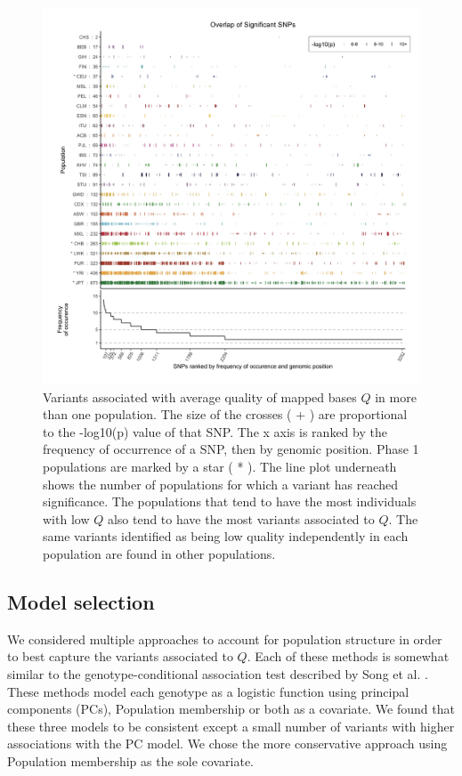 \documentclass[9pt,lineno]{elife}
\begin{document}
\begin{figure}
\includegraphics[width=\hsize,keepaspectratio]{./Figures/SNPOverlap6.jpg}

\caption{Variants associated with average quality of mapped bases $Q$ in more than one population.
The size of the crosses ( + ) are proportional to the -log10(p) value of that SNP.
The x axis is ranked by the frequency of occurrence of a SNP, then by genomic position.
Phase 1 populations are marked by a star ( * ).
The line plot underneath shows the number of populations for which a variant has reached significance.
The populations that tend to have the most individuals with low $Q$ also tend to have the most variants associated to $Q$. 
The same variants identified as being low quality independently in each population are found in other populations. }
  \label{OverLap}
\end{figure}

\subsection{Model selection}
We considered multiple approaches to account for population structure in order to best capture the variants associated to $Q$.
Each of these methods is somewhat similar to the genotype-conditional association test described by Song et al. \citep{song2015testing}.
These methods model each genotype as a logistic function using principal components (PCs), Population membership or both as a covariate. 
We found that these three models to be consistent except a small number of variants with higher associations with the PC model.
We chose the more conservative approach using Population membership as the sole covariate.
\end{document}
